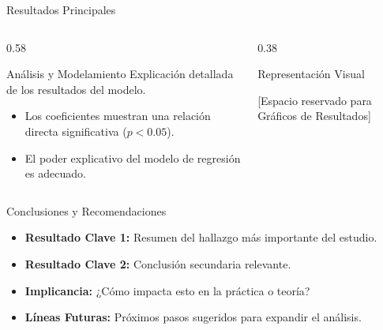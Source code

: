 \documentclass[aspectratio=169, xcolor={dvipsnames}, 8pt, spanish]{beamer}
\begin{document}
\begin{frame}{Resultados Principales}

\begin{columns}[T,onlytextwidth]
\begin{column}{0.58\textwidth}
\begin{block}{Análisis y Modelamiento}
    Explicación detallada de los resultados del modelo. 
    \begin{itemize}
        \item Los coeficientes muestran una relación directa significativa ($p < 0.05$).
        \item El poder explicativo del modelo de regresión es adecuado.
    \end{itemize}
\end{block}
\end{column}
\begin{column}{0.38\textwidth}
\begin{block}{Representación Visual}
    \begin{center}
        \color{gray}
        [Espacio reservado para Gráficos de Resultados]
    \end{center}
\end{block}
\end{column}
\end{columns}

\end{frame}

\begin{frame}{Conclusiones y Recomendaciones}

\begin{itemize}
    \item \textbf{Resultado Clave 1:} Resumen del hallazgo más importante del estudio.
    \item \textbf{Resultado Clave 2:} Conclusión secundaria relevante.
    \item \textbf{Implicancia:} ¿Cómo impacta esto en la práctica o teoría?
    \item \textbf{Líneas Futuras:} Próximos pasos sugeridos para expandir el análisis.
\end{itemize}

\end{frame}
\end{document}

